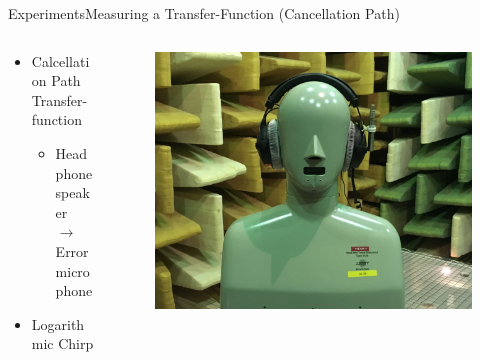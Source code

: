 \begin{frame}{Experiments}{Measuring a Transfer-Function (Cancellation Path)}		
	\begin{columns}
		\begin{column}{0.5\textwidth}
			\begin{itemize}
				\item Calcellation Path Transfer-function
				\begin{itemize}
					\item Headphone speaker \\ $\rightarrow$ Error microphone
				\end{itemize}
				\item{Logarithmic Chirp}
			\end{itemize}
		\end{column}
		\begin{column}{0.5\textwidth} 
			\begin{figure}[h]
				\includegraphics[width=1\textwidth]{figures/TransferFunctionCP}
			\end{figure}
		\end{column}
	\end{columns}
\end{frame}


